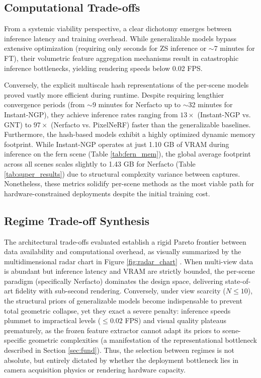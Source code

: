 \subsection{Computational Trade-offs}
From a systemic viability perspective, a clear dichotomy emerges between inference latency and training overhead. While generalizable models bypass extensive optimization (requiring only seconds for ZS inference or $\sim$7 minutes for FT), their volumetric feature aggregation mechanisms result in catastrophic inference bottlenecks, yielding rendering speeds below 0.02 FPS. 

Conversely, the explicit multiscale hash representations of the per-scene models proved vastly more efficient during runtime. Despite requiring lengthier convergence periods (from $\sim$9 minutes for Nerfacto up to $\sim$32 minutes for Instant-NGP), they achieve inference rates ranging from $13\times$ (Instant-NGP vs. GNT) to $97\times$ (Nerfacto vs. PixelNeRF) faster than the generalizable baselines. Furthermore, the hash-based models exhibit a highly optimized dynamic memory footprint. While Instant-NGP operates at just 1.10 GB of VRAM during inference on the fern scene (Table \ref{tab:fern_mem}), the global average footprint across all scenes scales slightly to 1.43 GB for Nerfacto (Table \ref{tab:super_results}) due to structural complexity variance between captures. Nonetheless, these metrics solidify per-scene methods as the most viable path for hardware-constrained deployments despite the initial training cost.

\subsection{Regime Trade-off Synthesis}
The architectural trade-offs evaluated establish a rigid Pareto frontier between data availability and computational overhead, as visually summarized by the multidimensional radar chart in Figure \ref{fig:radar_chart}
. When multi-view data is abundant but inference latency and VRAM are strictly bounded, the per-scene paradigm (specifically Nerfacto) dominates the design space, delivering state-of-art fidelity with sub-second rendering. Conversely, under view scarcity ($N \le 10$), the structural priors of generalizable models become indispensable to prevent total geometric collapse, yet they exact a severe penalty: inference speeds plummet to impractical levels ($\le 0.02$ FPS) and visual quality plateaus prematurely, as the frozen feature extractor cannot adapt its priors to scene-specific geometric complexities (a manifestation of the representational bottleneck described in Section \ref{sec:fund}). Thus, the selection between regimes is not absolute, but entirely dictated by whether the deployment bottleneck lies in camera acquisition physics or rendering hardware capacity.

